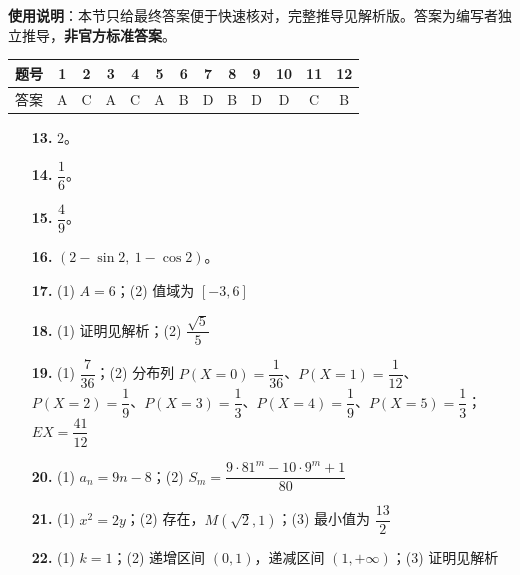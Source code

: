 
\begin{gknotice}
\textbf{使用说明}：本节只给最终答案便于快速核对，完整推导见解析版。答案为编写者独立推导，\textbf{非官方标准答案}。
\end{gknotice}

\begin{center}\begin{tabular}{ccccccccccccc}
\toprule
题号 & 1 & 2 & 3 & 4 & 5 & 6 & 7 & 8 & 9 & 10 & 11 & 12 \\
\midrule
答案 & A & C & A & C & A & B & D & B & D & D & C & B \\
\bottomrule
\end{tabular}\end{center}

\begin{itemize}[leftmargin=2.6em]
  \item[\textbf{13.}] $2$。
  \item[\textbf{14.}] $\dfrac16$。
  \item[\textbf{15.}] $\dfrac49$。
  \item[\textbf{16.}] $(2-\sin2,\ 1-\cos2)$。
\end{itemize}

\begin{itemize}[leftmargin=2.6em]
  \item[\textbf{17.}] (1) $A=6$；(2) 值域为 $[-3,6]$
  \item[\textbf{18.}] (1) 证明见解析；(2) $\dfrac{\sqrt5}5$
  \item[\textbf{19.}] (1) $\dfrac7{36}$；(2) 分布列 $P(X=0)=\dfrac1{36}$、$P(X=1)=\dfrac1{12}$、$P(X=2)=\dfrac19$、$P(X=3)=\dfrac13$、$P(X=4)=\dfrac19$、$P(X=5)=\dfrac13$；$EX=\dfrac{41}{12}$
  \item[\textbf{20.}] (1) $a_n=9n-8$；(2) $S_m=\dfrac{9\cdot81^m-10\cdot9^m+1}{80}$
  \item[\textbf{21.}] (1) $x^2=2y$；(2) 存在，$M(\sqrt2,1)$；(3) 最小值为 $\dfrac{13}2$
  \item[\textbf{22.}] (1) $k=1$；(2) 递增区间 $(0,1)$，递减区间 $(1,+\infty)$；(3) 证明见解析
\end{itemize}
